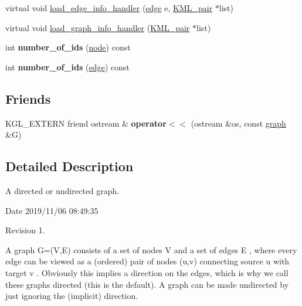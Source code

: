 \begin{DoxyCompactItemize}
\item 
virtual void \mbox{\hyperlink{classgraph_a5c1adb0ed2098d371174980f6046ccee}{load\+\_\+edge\+\_\+info\+\_\+handler}} (\mbox{\hyperlink{classedge}{edge}} e, \mbox{\hyperlink{struct_k_m_l__pair}{K\+M\+L\+\_\+pair}} $\ast$list)
\item 
virtual void \mbox{\hyperlink{classgraph_a145881c1aa608d940280a88eb372d189}{load\+\_\+graph\+\_\+info\+\_\+handler}} (\mbox{\hyperlink{struct_k_m_l__pair}{K\+M\+L\+\_\+pair}} $\ast$list)
\item 
\mbox{\label{classgraph_a82f09714f50dbe41e1a9cbcb12ad0866}} 
int {\bfseries number\+\_\+of\+\_\+ids} (\mbox{\hyperlink{classnode}{node}}) const
\item 
\mbox{\label{classgraph_a8db97e43b31c95ac6b0bd1820aa5224b}} 
int {\bfseries number\+\_\+of\+\_\+ids} (\mbox{\hyperlink{classedge}{edge}}) const
\end{DoxyCompactItemize}
\subsection*{Friends}
\begin{DoxyCompactItemize}
\item 
\mbox{\label{classgraph_a4f24fd2117ed8b6133a09d244927b74b}} 
K\+G\+L\+\_\+\+E\+X\+T\+E\+RN friend ostream \& {\bfseries operator$<$$<$} (ostream \&os, const \mbox{\hyperlink{classgraph}{graph}} \&G)
\end{DoxyCompactItemize}


\subsection{Detailed Description}
A directed or undirected graph. 

\begin{DoxyParagraph}{Date}
2019/11/06 08\+:49\+:35 
\end{DoxyParagraph}
\begin{DoxyParagraph}{Revision}
1. 
\end{DoxyParagraph}


A graph G=(V,E) consists of a set of nodes V and a set of edges E , where every edge can be viewed as a (ordered) pair of nodes (u,v) connecting source u with target v . Obviously this implies a direction on the edges, which is why we call these graphs directed (this is the default). A graph can be made undirected by just ignoring the (implicit) direction.

